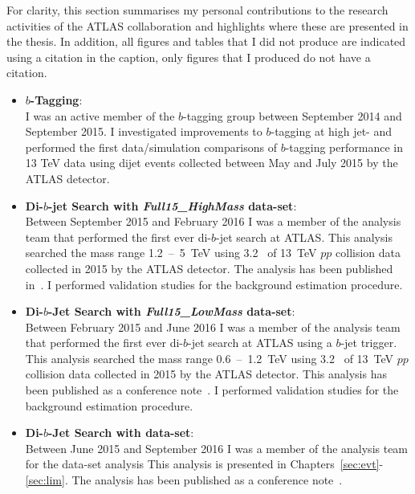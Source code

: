 For clarity, this section summarises my personal contributions to the research activities of the ATLAS collaboration
and highlights where these are presented in the thesis.
In addition, all figures and tables that I did not produce are indicated using a citation in the caption,
only figures that I produced do not have a citation.


\begin{itemize}[leftmargin=*]
\item\textbf{$b$-Tagging}:\\
  I was an active member of the $b$-tagging group between September 2014 and September 2015.
  I investigated improvements to $b$-tagging at high jet-\pT{} and
  performed the first data/simulation comparisons of $b$-tagging performance in 13 TeV data using dijet events collected between May and July 2015 by the ATLAS detector. \vspace{1em}
\item\textbf{Di-$b$-jet Search with \textit{Full15\_HighMass} data-set}:\\
  Between September 2015 and February 2016 I was a member of the analysis team that performed the first ever di-$b$-jet search at ATLAS.
  This analysis searched the mass range 1.2~--~5~TeV using 3.2~\ifb{} of 13~TeV $pp$ collision data collected in 2015 by the ATLAS detector.
  The analysis has been published in~\cite{dibjet-mori16_paper}. 
  I performed validation studies for the background estimation procedure. \vspace{1em}
\item\textbf{Di-$b$-Jet Search  with \textit{Full15\_LowMass} data-set}:\\
  Between February 2015 and June 2016 I was a member of the analysis team that performed the first ever di-$b$-jet search at ATLAS using a $b$-jet trigger.
  This analysis searched the mass range 0.6~--~1.2~TeV using 3.2~\ifb{} of 13~TeV $pp$ collision data collected in 2015 by the ATLAS detector.
  This analysis has been published as a conference note~\cite{dibjet-lhcp_conf}.
  I performed validation studies for the background estimation procedure. \vspace{1em}
    \newpage
\item\textbf{Di-$b$-Jet Search  with \summer{} data-set}:\\ 
  Between June 2015 and September 2016 I was a member of the analysis team for the \summer{} data-set analysis
  This analysis is presented in Chapters~\ref{sec:evt}-\ref{sec:lim}.
  The analysis has been published as a conference note~\cite{dibjet-ichep_conf}. 

\end{itemize}
